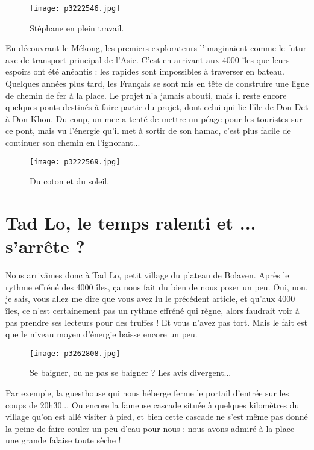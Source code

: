 \documentclass{book}
\begin{document}
\begin{figure}[h]
\centering
\texttt{[image: p3222546.jpg]}
\caption*{Stéphane en plein travail.}
\end{figure}

En découvrant le Mékong, les premiers explorateurs l'imaginaient comme le futur axe de transport principal de l'Asie. C'est en arrivant aux 4000 îles que leurs espoirs ont été anéantis : les rapides sont impossibles à traverser en bateau. Quelques années plus tard, les Français se sont mis en tête de construire une ligne de chemin de fer à la place. Le projet n'a jamais abouti, mais il reste encore quelques ponts destinés à faire partie du projet, dont celui qui lie l'île de Don Det à Don Khon. Du coup, un mec a tenté de mettre un péage pour les touristes sur ce pont, mais vu l’énergie qu'il met à sortir de son hamac, c'est plus facile de continuer son chemin en l'ignorant...


\begin{figure}[h]
\centering
\texttt{[image: p3222569.jpg]}
\caption*{Du coton et du soleil.}
\end{figure}



\chapter{Tad Lo, le temps ralenti et ... s'arrête ?}
Nous arrivâmes donc à Tad Lo, petit village du plateau de Bolaven. Après le rythme effréné des 4000 îles, ça nous fait du bien de nous poser un peu. Oui, non, je sais, vous allez me dire que vous avez lu le précédent article, et qu'aux 4000 îles, ce n'est certainement pas un rythme effréné qui règne, alors faudrait voir à pas prendre ses lecteurs pour des truffes ! Et vous n'avez pas tort. Mais le fait est que le niveau moyen d'énergie baisse encore un peu.


\begin{figure}[h]
\centering
\texttt{[image: p3262808.jpg]}
\caption*{Se baigner, ou ne pas se baigner ? Les avis divergent...}
\end{figure}

Par exemple, la guesthouse qui nous héberge ferme le portail d'entrée sur les coups de 20h30... Ou encore la fameuse cascade située à quelques kilomètres du village qu'on est allé visiter à pied, et bien cette cascade ne s'est même pas donné la peine de faire couler un peu d'eau pour nous : nous avons admiré à la place une grande falaise toute sèche !
\end{document}
